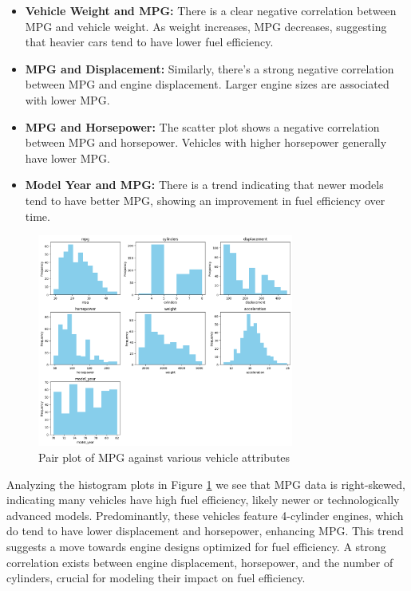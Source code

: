 \documentclass[11pt,a4paper]{article}
\begin{document}
\begin{itemize}
    \item \textbf{Vehicle Weight and MPG:} There is a clear negative correlation between MPG and vehicle weight. As weight increases, MPG decreases, suggesting that heavier cars tend to have lower fuel efficiency.
    \item \textbf{MPG and Displacement:} Similarly, there's a strong negative correlation between MPG and engine displacement. Larger engine sizes are associated with lower MPG.
    \item \textbf{MPG and Horsepower:} The scatter plot shows a negative correlation between MPG and horsepower. Vehicles with higher horsepower generally have lower MPG.
    \item \textbf{Model Year and MPG:} There is a trend indicating that newer models tend to have better MPG, showing an improvement in fuel efficiency over time.
\end{itemize}

\begin{figure}[ht]
    \centering
    \includegraphics[width=0.75\textwidth]{images/hist.png}
    \caption{Pair plot of MPG against various vehicle attributes}
    \label{fig:mpghistogram}
\end{figure}

\noindent
Analyzing the histogram plots in Figure \ref{fig:mpghistogram} we see that MPG data is right-skewed, indicating many vehicles have high fuel efficiency,
likely newer or technologically advanced models. Predominantly, these vehicles feature 4-cylinder engines, which do tend to have lower displacement and horsepower, enhancing MPG.
This trend suggests a move towards engine designs optimized for fuel efficiency. A strong correlation exists between engine displacement,
horsepower, and the number of cylinders, crucial for modeling their impact on fuel efficiency.
\vspace*{11pt}
\end{document}
